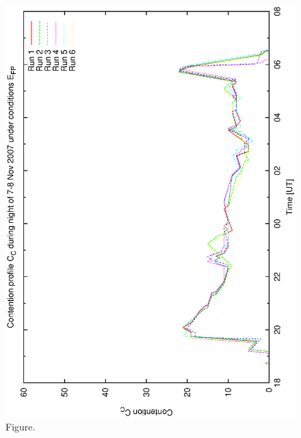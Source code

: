 \documentclass[12pt,a4paper]{article}
\begin{document}
\begin{figure}[htbp]
 \begin{center}
  \includegraphics[scale=1.0, angle=0]{figures/bsb_pr_cont.eps}
 \end{center}
  \caption[Figure.]
{Figure.}
\end{figure}
\clearpage
\end{document}
